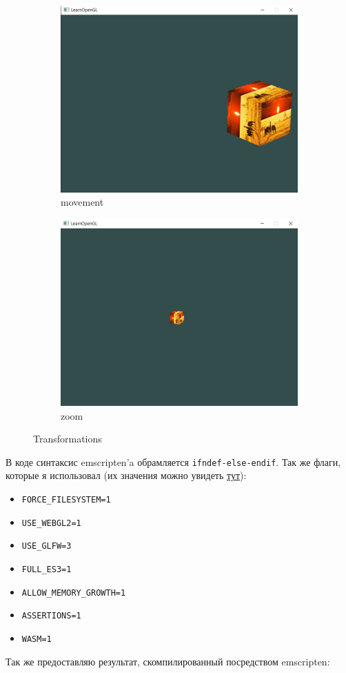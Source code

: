 \documentclass[12pt]{article}
\newcounter{subsubsubsection}[subsubsection]
\begin{document}
\begin{figure}[h]
\begin{subfigure}{.5\textwidth}
        \centering
        \includegraphics[width=.8\linewidth]{images/res_movement.png}
        \caption{movement}
        \label{fig:sfig2}
      \end{subfigure}
      \begin{subfigure}{.5\textwidth}
        \centering
        \includegraphics[width=.8\linewidth]{images/res_zoom.png}
        \caption{zoom}
        \label{fig:sfig2}
      \end{subfigure}
    \caption{Transformations}
    \label{fig:fig}
  \end{figure}

  \noindent
  В коде синтаксис emscripten'a обрамляется \texttt{ifndef-else-endif}.
  Так же флаги, которые я использовал (их значения можно увидеть \href{https://emscripten.org/docs/tools_reference/emcc.html}{тут}):
  \begin{itemize}
    \item \texttt{FORCE\_FILESYSTEM=1}
    \item \texttt{USE\_WEBGL2=1}
    \item \texttt{USE\_GLFW=3}
    \item \texttt{FULL\_ES3=1}
    \item \texttt{ALLOW\_MEMORY\_GROWTH=1}
    \item \texttt{ASSERTIONS=1}
    \item \texttt{WASM=1}
  \end{itemize}
  \newpage
  Так же предоставляю результат, скомпилированный посредством emscripten:
\end{document}

